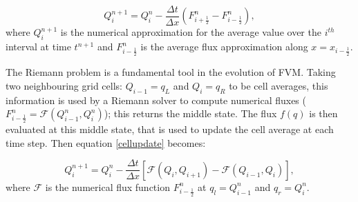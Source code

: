 \documentclass[10pt,a4paper]{article}
\begin{document}
	\begin{equation}
		Q_{i}^{n+1} = Q_{i}^{n} - \frac{\Delta t}{\Delta x} (F_{i+\frac{1}{2}}^{n} - F_{i-\frac{1}{2}}^{n}),
		\label{cellupdate}
	\end{equation}	
	where $Q_{i}^{n+1}$ is the numerical approximation for the average value over the $i^{th}$ interval at time $t^{n+1}$ and $F_{i-\frac{1}{2}}^{n} $ is the average flux approximation along $x=x_{i-\frac{1}{2}}$.
	
	The Riemann problem is a fundamental tool in the evolution of FVM. Taking two neighbouring grid cells: $Q_{i-1} = q_{L}$ and $Q_{i} = q_{R}$ to be cell averages, this information is used by a Riemann solver to compute numerical fluxes ( $F_{i-\frac{1}{2}}^{n} = \mathcal{F}(Q_{i-1}^{n} , Q_{i}^{n} )$); this returns the middle state.  The flux $f(q)$ is then evaluated at this middle state, that is used to update the cell average at each time step. Then equation \eqref{cellupdate} becomes:
	
	\begin{equation}
		Q_{i}^{n+1} = Q_{i}^{n} - \frac{\Delta t}{\Delta x} \left[ \mathcal{F}(Q_{i} , Q_{i+1} ) - \mathcal{F}(Q_{i-1} , Q_{i} ) \right],
		\label{cellupdat}
	\end{equation}
	where $\mathcal{F}$ is the  numerical flux function $F_{i-\frac{1}{2}}^{n}$ at $q_l = Q_{i-1}^{n}$  and $q_r = Q_{i}^{n}$.
	
\end{document}

